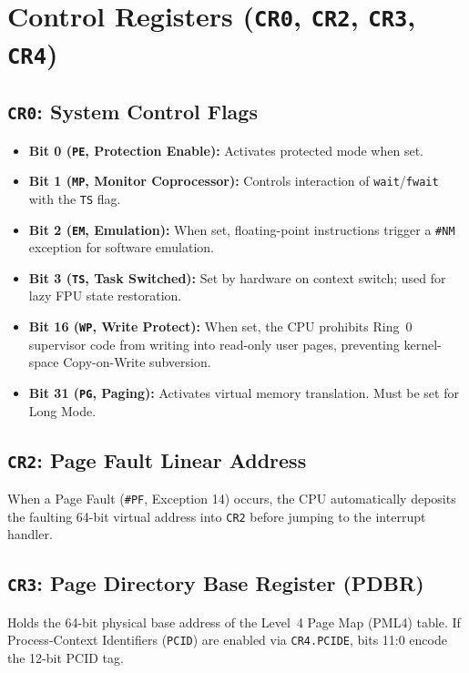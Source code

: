 \section{Control Registers (\texttt{CR0}, \texttt{CR2}, \texttt{CR3}, \texttt{CR4})}
\label{sec:cr_ref}

\subsection{\texttt{CR0}: System Control Flags}
\begin{itemize}
    \item \textbf{Bit 0 (\texttt{PE}, Protection Enable):} Activates protected mode when set.
    \item \textbf{Bit 1 (\texttt{MP}, Monitor Coprocessor):} Controls interaction of \texttt{wait}/\texttt{fwait} with the \texttt{TS} flag.
    \item \textbf{Bit 2 (\texttt{EM}, Emulation):} When set, floating-point instructions trigger a \texttt{\#NM} exception for software emulation.
    \item \textbf{Bit 3 (\texttt{TS}, Task Switched):} Set by hardware on context switch; used for lazy FPU state restoration.
    \item \textbf{Bit 16 (\texttt{WP}, Write Protect):} When set, the CPU prohibits Ring~0 supervisor code from writing into read-only user pages, preventing kernel-space Copy-on-Write subversion.
    \item \textbf{Bit 31 (\texttt{PG}, Paging):} Activates virtual memory translation. Must be set for Long Mode.
\end{itemize}

\subsection{\texttt{CR2}: Page Fault Linear Address}
When a Page Fault (\texttt{\#PF}, Exception 14) occurs, the CPU automatically deposits the faulting 64-bit virtual address into \texttt{CR2} before jumping to the interrupt handler.

\subsection{\texttt{CR3}: Page Directory Base Register (PDBR)}
Holds the 64-bit physical base address of the Level~4 Page Map (PML4) table. If Process-Context Identifiers (\texttt{PCID}) are enabled via \texttt{CR4.PCIDE}, bits 11:0 encode the 12-bit PCID tag.

